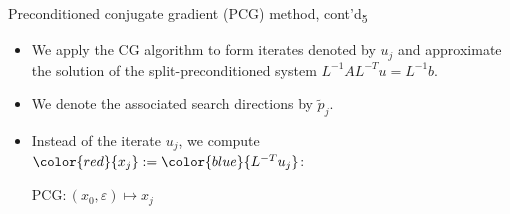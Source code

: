 \documentclass[t,usepdftitle=false]{beamer}
\begin{document}
\begin{frame}{Preconditioned conjugate gradient (PCG) method, cont'd\textsubscript{5}}
\begin{itemize}
\item We apply the CG algorithm to form iterates denoted by $u_j$ and approximate the solution of the split-preconditioned system $L^{-1}AL^{-T}u=L^{-1}b$.
\item[] We denote the associated search directions by $\tilde{p}_j$.
\item[] Instead of the iterate $u_j$, we compute ${\color{red}{x_j}}:={\color{blue}{L^{-T}u_j}}$:
\vspace{-.25cm}
\begin{algorithm}[H]
\small
\caption{PCG$:(x_0,\varepsilon)\mapsto x_j$}
\begin{algorithmic}[1]
\ENDFOR
\end{algorithmic}
\end{algorithm}
\end{itemize}
\end{frame}
\setcounter{framenumber}{8}
\end{document}
